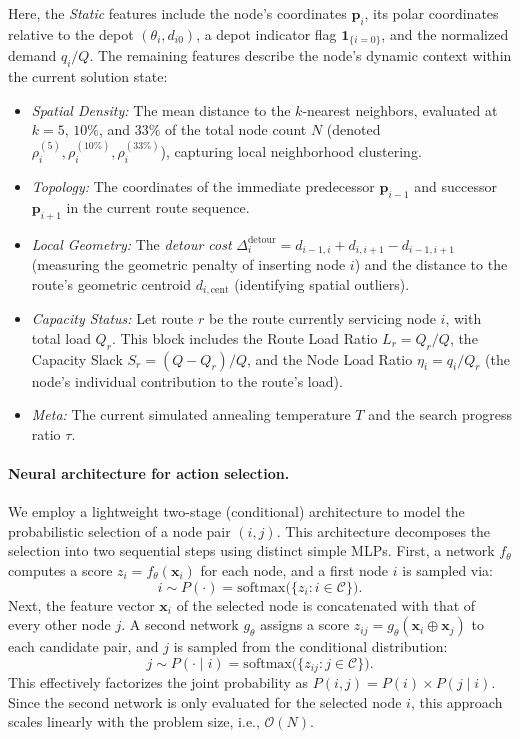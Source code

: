 \documentclass[letterpaper]{article} %
\begin{document}
Here, the \textit{Static} features include the node's coordinates $\mathbf{p}_i$, its polar coordinates relative to the depot $(\theta_i, d_{i0})$, a depot indicator flag $\mathbf{1}_{\{i=0\}}$, and the normalized demand $q_i/Q$. The remaining features describe the node's dynamic context within the current solution state:
\begin{itemize}
    \item \textit{Spatial Density:} The mean distance to the $k$-nearest neighbors, evaluated at $k=5$, $10\%$, and $33\%$ of the total node count $N$ (denoted $\rho^{(5)}_i, \rho^{(10\%)}_i, \rho^{(33\%)}_i$), capturing local neighborhood clustering.
    \item \textit{Topology:} The coordinates of the immediate predecessor $\mathbf{p}_{i-1}$ and successor $\mathbf{p}_{i+1}$ in the current route sequence.
    \item \textit{Local Geometry:} The \textit{detour cost} $\Delta^{\text{detour}}_i = d_{i-1, i} + d_{i, i+1} - d_{i-1, i+1}$ (measuring the geometric penalty of inserting node $i$) and the distance to the route's geometric centroid $d_{i, \text{cent}}$ (identifying spatial outliers).
    \item \textit{Capacity Status:} Let route $r$ be the route currently servicing node $i$, with total load $Q_r$. This block includes the Route Load Ratio $L_r = Q_r/Q$, the Capacity Slack $S_r = (Q - Q_r)/Q$, and the Node Load Ratio $\eta_i = q_i/Q_r$ (the node's individual contribution to the route's load).
    \item \textit{Meta:} The current simulated annealing temperature $T$ and the search progress ratio $\tau$.
\end{itemize}

\paragraph{Neural architecture for action selection.}
\label{par:neural_architecture}
We employ a lightweight two-stage (conditional) architecture to model the probabilistic selection of a node pair $(i, j)$. This architecture decomposes the selection into two sequential steps using distinct simple MLPs. First, a network $f_{\theta}$ computes a score $z_i = f_{\theta}(\mathbf{x}_i)$ for each node, and a first node $i$ is sampled via:
$$
i \sim P(\cdot) = \mathrm{softmax} \big( \{ z_i : i \in \mathcal{C} \} \big).
$$
Next, the feature vector $\mathbf{x}_i$ of the selected node is concatenated with that of every other node $j$. A second network $g_{\theta}$ assigns a score $z_{ij} = g_{\theta}(\mathbf{x}_i \oplus \mathbf{x}_j)$ to each candidate pair, and $j$ is sampled from the conditional distribution:
$$
j \sim P(\cdot \mid i) = \mathrm{softmax} \big( \{ z_{ij} :  j \in \mathcal{C} \} \big).
$$
This effectively factorizes the joint probability as $P(i, j) = P(i) \times P(j \mid i)$. Since the second network is only evaluated for the selected node $i$, this approach scales linearly with the problem size, i.e., $\mathcal{O}(N)$.
\end{document}
